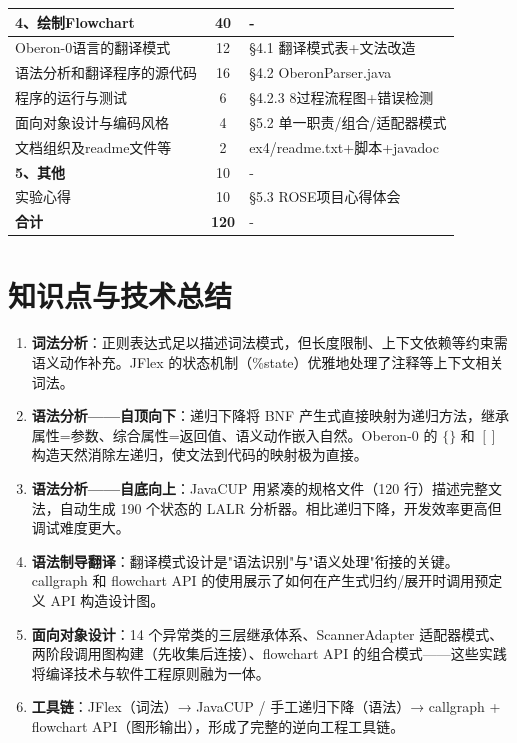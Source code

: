 \begin{table}[htbp]
\begin{tabular}{|p{5.5cm}|c|p{8cm}|}
    \hline
    \quad \textbf{4、绘制Flowchart} & 40 & - \\
    \hline
    \quad Oberon-0语言的翻译模式 & 12 & \S4.1 翻译模式表+文法改造 \\
    \quad 语法分析和翻译程序的源代码 & 16 & \S4.2 OberonParser.java \\
    \quad 程序的运行与测试 & 6 & \S4.2.3 8过程流程图+错误检测 \\
    \quad 面向对象设计与编码风格 & 4 & \S5.2 单一职责/组合/适配器模式 \\
    \quad 文档组织及readme文件等 & 2 & ex4/readme.txt+脚本+javadoc \\
    \hline
    \quad \textbf{5、其他} & 10 & - \\
    \hline
    \quad 实验心得 & 10 & \S5.3 ROSE项目心得体会 \\
    \hline
    \textbf{合计} & \textbf{120} & - \\
    \hline
    \end{tabular}
\end{table}

\section{知识点与技术总结}

\begin{enumerate}
    \item \textbf{词法分析}：正则表达式足以描述词法模式，但长度限制、上下文依赖等约束需语义动作补充。JFlex 的状态机制（\%state）优雅地处理了注释等上下文相关词法。
    \item \textbf{语法分析——自顶向下}：递归下降将 BNF 产生式直接映射为递归方法，继承属性=参数、综合属性=返回值、语义动作嵌入自然。Oberon-0 的 $\{\}$ 和 $[]$ 构造天然消除左递归，使文法到代码的映射极为直接。
    \item \textbf{语法分析——自底向上}：JavaCUP 用紧凑的规格文件（120 行）描述完整文法，自动生成 190 个状态的 LALR 分析器。相比递归下降，开发效率更高但调试难度更大。
    \item \textbf{语法制导翻译}：翻译模式设计是"语法识别"与"语义处理"衔接的关键。callgraph 和 flowchart API 的使用展示了如何在产生式归约/展开时调用预定义 API 构造设计图。
    \item \textbf{面向对象设计}：14 个异常类的三层继承体系、ScannerAdapter 适配器模式、两阶段调用图构建（先收集后连接）、flowchart API 的组合模式——这些实践将编译技术与软件工程原则融为一体。
    \item \textbf{工具链}：JFlex（词法）→ JavaCUP / 手工递归下降（语法）→ callgraph + flowchart API（图形输出），形成了完整的逆向工程工具链。
\end{enumerate}

